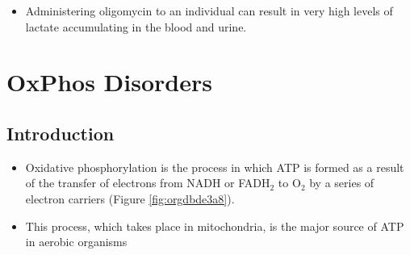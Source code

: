 \documentclass{scrartcl}
\begin{document}
\begin{enumerate}
\begin{itemize}
\item Administering oligomycin to an individual can result in very high
levels of lactate accumulating in the blood and urine.
\end{itemize}
\end{enumerate}
\section{OxPhos Disorders}
\label{sec:org49604d4}
\subsection{Introduction}
\label{sec:org7009bde}
\begin{itemize}
\item Oxidative phosphorylation is the process in which ATP is formed as a
result of the transfer of electrons from NADH or FADH\(_{\text{2}}\) to O\(_{\text{2}}\) by a
series of electron carriers (Figure \ref{fig:orgdbde3a8}).
\item This process, which takes place in mitochondria, is the major source
of ATP in aerobic organisms
\end{itemize}
\end{document}
